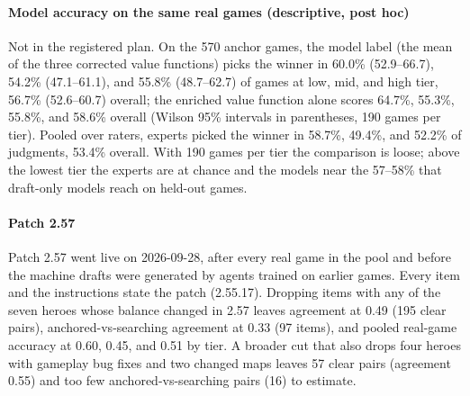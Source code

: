 \documentclass[journal]{IEEEtran}
\begin{document}
\paragraph{Model accuracy on the same real games (descriptive, post hoc)} Not in the registered plan. On the 570 anchor games, the model label (the mean of the three corrected value functions) picks the winner in 60.0\% (52.9--66.7), 54.2\% (47.1--61.1), and 55.8\% (48.7--62.7) of games at low, mid, and high tier, 56.7\% (52.6--60.7) overall; the enriched value function alone scores 64.7\%, 55.3\%, 55.8\%, and 58.6\% overall (Wilson 95\% intervals in parentheses, 190 games per tier). Pooled over raters, experts picked the winner in 58.7\%, 49.4\%, and 52.2\% of judgments, 53.4\% overall. With 190 games per tier the comparison is loose; above the lowest tier the experts are at chance and the models near the 57--58\% that draft-only models reach on held-out games.

\paragraph{Patch 2.57} Patch 2.57 went live on 2026-09-28, after every real game in the pool and before the machine drafts were generated by agents trained on earlier games. Every item and the instructions state the patch (2.55.17). Dropping items with any of the seven heroes whose balance changed in 2.57 leaves agreement at 0.49 (195 clear pairs), anchored-vs-searching agreement at 0.33 (97 items), and pooled real-game accuracy at 0.60, 0.45, and 0.51 by tier. A broader cut that also drops four heroes with gameplay bug fixes and two changed maps leaves 57 clear pairs (agreement 0.55) and too few anchored-vs-searching pairs (16) to estimate.
\end{document}
